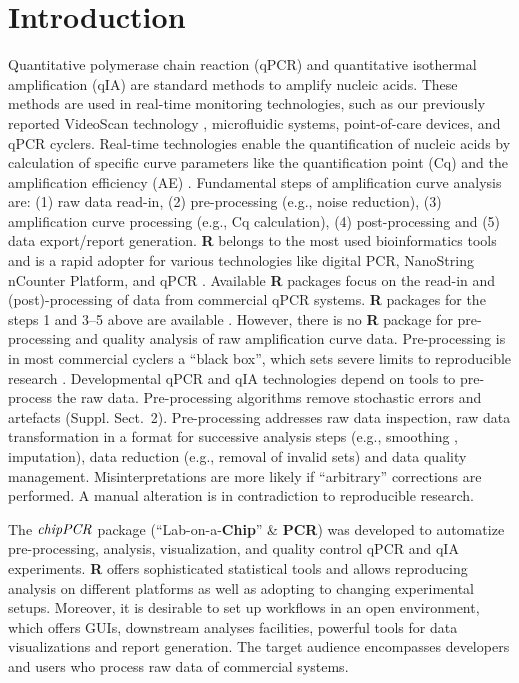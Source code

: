 \documentclass{bioinfo}
\begin{document}
\section{Introduction}

Quantitative polymerase chain reaction (qPCR) and quantitative isothermal 
amplification (qIA) are standard methods to amplify nucleic acids. These methods 
are used in real-time monitoring technologies, such as our previously reported 
VideoScan technology \citep{roediger_highly_2013}, microfluidic systems, point-of-care devices, and qPCR 
cyclers. Real-time technologies enable the quantification of nucleic acids by 
calculation of specific curve parameters like the quantification point (Cq) and 
the amplification efficiency (AE) 
\citep{pabinger_2014,rodiger_nucleic_2014}. Fundamental 
steps of amplification curve analysis are: (1) raw data read-in, (2) 
pre-processing (e.g., noise reduction), (3) amplification curve processing 
(e.g., Cq calculation), (4) post-processing and (5) data 
export/report generation. \textbf{R} belongs to the most used bioinformatics	
tools and is a rapid adopter for various technologies like digital PCR, 
NanoString nCounter Platform, and qPCR \citep{waggott_2012,pabinger_2014}. 
Available \textbf{R} packages focus on the read-in and (post)-processing of data 
from commercial qPCR systems. \textbf{R} packages for the steps 1 and 3--5 above 
are available \citep{perkins_2012,gehlenborg_2013,mccall_2014,pabinger_2014}. 
However, there is no \textbf{R} package for pre-processing and quality analysis 
of raw amplification curve data. Pre-processing is in most commercial cyclers a 
``black box'', which sets severe limits to reproducible research 
\citep{Leeper_2014}. Developmental qPCR and qIA technologies depend on tools to 
pre-process the raw data. Pre-processing algorithms remove stochastic errors and 
artefacts (Suppl. Sect.~2). Pre-processing addresses raw data inspection, raw data transformation in a format for 
successive analysis steps (e.g., smoothing \citep{spiess_impact_2014}, 
imputation), data reduction (e.g., removal of invalid sets) and data quality 
management. Misinterpretations are more likely if ``arbitrary'' corrections are 
performed. A manual alteration is in contradiction to reproducible research.

The $\emph{chipPCR}$ package (``Lab-on-a-\textbf{Chip}'' \& \textbf{PCR}) was 
developed to automatize pre-processing, analysis, visualization, and quality 
control qPCR and qIA experiments. \textbf{R} offers sophisticated statistical 
tools and allows reproducing analysis on different platforms as well as adopting 
to changing experimental setups. Moreover, it is desirable to set up workflows 
in an open environment, which offers GUIs, downstream analyses facilities, 
powerful tools for data visualizations and report generation. The 
target audience encompasses developers and users who process raw data of 
commercial systems.
\end{document}
